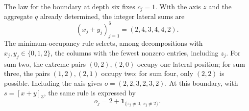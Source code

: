 The law for the boundary at depth six fixes \(c_j=1\). With the axis \(z\) and the
aggregate \(q\) already determined, the integer lateral sums are
\[
 (x_j+y_j)_{j=1}^6=(2,4,3,4,4,2).
\]
The minimum-occupancy rule selects, among decompositions with
\(x_j,y_j\in\{0,1,2\}\), the columns with the fewest nonzero entries,
including \(z_j\). For sum two, the extreme pairs \((0,2),(2,0)\)
occupy one lateral position; for sum three, the pairs \((1,2),(2,1)\)
occupy two; for sum four, only \((2,2)\) is possible. Including the
axis gives \(o=(2,2,3,2,3,2)\). At this boundary, with
\(s=[x+y]_3\), the same rule is expressed by
\[
 o_j=2+\mathbf1_{\{z_j\ne0,\ s_j\ne2\}}.
\]
